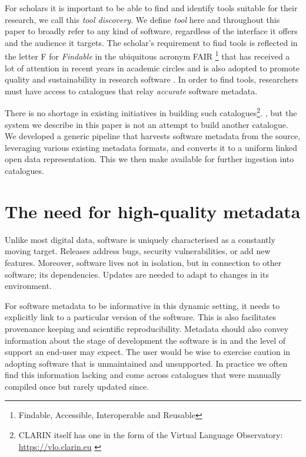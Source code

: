 \documentclass[a4paper,11pt]{article}
\begin{document}
For scholars it is important to be able to find and identify tools
suitable for their research, we call this \emph{tool discovery}. We define
\emph{tool} here and throughout this paper to broadly refer to any kind of
software, regardless of the interface it offers and the audience it targets.
The scholar's requirement to find tools is reflected in the letter \textsc{F}
for \emph{Findable} in the ubiquitous acronym \textsc{FAIR} \footnote{Findable,
Accessible, Interoperable and Reusable} that has received a lot of attention in
recent years in academic circles and is also adopted to promote quality and
sustainability in research software \citep{FAIR}. In order to find tools,
researchers must have access to catalogues that relay \emph{accurate} software
metadata.

There is no shortage in existing initiatives in building such catalogues\footnote{CLARIN itself has one in the form of the Virtual Language Observatory: \url{https://vlo.clarin.eu} \citep{VLO}}.
, %
but the system we describe in this paper is not an attempt to build another catalogue.
We developed a generic pipeline that harvests software metadata from the source, leveraging
various existing metadata formats, and converts it to a uniform linked open data representation.
This we then make available for further ingestion into catalogues. 



\section{The need for high-quality metadata}

Unlike most digital data, software is uniquely characterised as a constantly
moving target. Releases address bugs, security vulnerabilities, or add new
features. Moreover, software lives not in isolation, but in connection to other
software; its dependencies. Updates are needed to adapt to changes in its
environment.

For software metadata to be informative in this dynamic setting, it needs to
explicitly link to a particular version of the software. This is also
facilitates provenance keeping and scientific reproducibility. Metadata should
also convey information about the stage of development the software is in and
the level of support an end-user may expect. The user would be wise to exercise
caution in adopting software that is unmaintained and unsupported. In practice
we often find this information lacking and come across catalogues that were
manually compiled once but rarely updated since.
\end{document}
